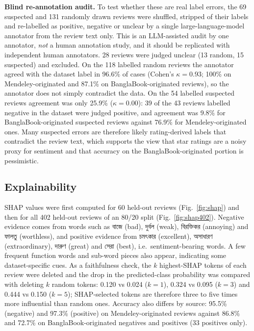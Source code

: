 \documentclass[journal]{IEEEtran}
\newcommand{\bn}[1]{{\bnfont #1}}
\begin{document}
\textbf{Blind re-annotation audit.} To test whether these are real label errors, the 69 suspected and 131 randomly drawn reviews were shuffled, stripped of their labels and re-labelled as positive, negative or unclear by a single large-language-model annotator from the review text only. This is an LLM-assisted audit by one annotator, \emph{not} a human annotation study, and it should be replicated with independent human annotators. 28 reviews were judged unclear (13 random, 15 suspected) and excluded. On the 118 labelled random reviews the annotator agreed with the dataset label in 96.6\% of cases (Cohen's $\kappa=0.93$; 100\% on Mendeley-originated and 87.1\% on BanglaBook-originated reviews), so the annotator does not simply contradict the data. On the 54 labelled suspected reviews agreement was only 25.9\% ($\kappa=0.00$): 39 of the 43 reviews labelled negative in the dataset were judged positive, and agreement was 9.8\% for BanglaBook-originated suspected reviews against 76.9\% for Mendeley-originated ones. Many suspected errors are therefore likely rating-derived labels that contradict the review text, which supports the view that star ratings are a noisy proxy for sentiment and that accuracy on the BanglaBook-originated portion is pessimistic.

\subsection{Explainability}
SHAP values \cite{lundberg2017} were first computed for 60 held-out reviews (Fig.~\ref{fig:shap}) and then for all 402 held-out reviews of an 80/20 split (Fig.~\ref{fig:shap402}). Negative evidence comes from words such as \bn{বাজে} (bad), \bn{দুর্বল} (weak), \bn{বিরক্তিকর} (annoying) and \bn{ফালতু} (worthless), and positive evidence from \bn{চমৎকার} (excellent), \bn{অসাধারণ} (extraordinary), \bn{দারুণ} (great) and \bn{সেরা} (best), i.e.\ sentiment-bearing words. A few frequent function words and sub-word pieces also appear, indicating some dataset-specific cues. As a faithfulness check, the $k$ highest-SHAP tokens of each review were deleted and the drop in the predicted-class probability was compared with deleting $k$ random tokens: 0.120 vs 0.024 ($k=1$), 0.324 vs 0.095 ($k=3$) and 0.444 vs 0.150 ($k=5$); SHAP-selected tokens are therefore three to five times more influential than random ones. Accuracy also differs by source: 95.5\% (negative) and 97.3\% (positive) on Mendeley-originated reviews against 86.8\% and 72.7\% on BanglaBook-originated negatives and positives (33 positives only).
\end{document}
